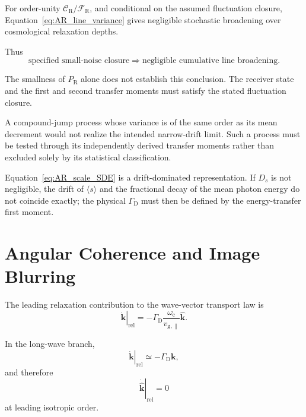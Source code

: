 For order-unity
\(\mathcal C_{\mathrm R}/\mathcal F_{\mathrm R}\),
and conditional on the assumed fluctuation closure,
Equation~\eqref{eq:AR_line_variance} gives negligible stochastic broadening
over cosmological relaxation depths.

Thus
\begin{equation}
    \boxed{
    \text{specified small-noise closure}
    \Longrightarrow
    \text{negligible cumulative line broadening}.
    }
    \label{eq:AR_line_pass}
\end{equation}

The smallness of \(P_{\mathrm R}\) alone does not establish this conclusion.
The receiver state and the first and second transfer moments must satisfy the
stated fluctuation closure.

A compound-jump process whose variance is of the same order as its mean
decrement would not realize the intended narrow-drift limit. Such a process
must be tested through its independently derived transfer moments rather than
excluded solely by its statistical classification.

Equation~\eqref{eq:AR_scale_SDE} is a drift-dominated representation. If
\(D_s\) is not negligible, the drift of \(\langle s\rangle\) and the
fractional decay of the mean photon energy do not coincide exactly; the
physical \(\Gamma_{\mathrm D}\) must then be defined by the energy-transfer
first moment.


\section{Angular Coherence and Image Blurring}

The leading relaxation contribution to the wave-vector transport law is
\begin{equation}
    \left.
    \dot{\mathbf{k}}
    \right|_{\mathrm{rel}}
    =
    -\Gamma_{\mathrm D}
    \frac{
        \omega_{\mathrm c}
    }{
        v_{\mathrm{g},\parallel}
    }
    \hat{\mathbf{k}}.
    \label{eq:AR_k_transport}
\end{equation}

In the long-wave branch,
\begin{equation}
    \left.
    \dot{\mathbf{k}}
    \right|_{\mathrm{rel}}
    \simeq
    -\Gamma_{\mathrm D}\mathbf{k},
\end{equation}
and therefore
\begin{equation}
    \boxed{
    \left.
    \dot{\hat{\mathbf{k}}}
    \right|_{\mathrm{rel}}
    =
    0
    }
    \label{eq:AR_no_angle_drift}
\end{equation}
at leading isotropic order.

